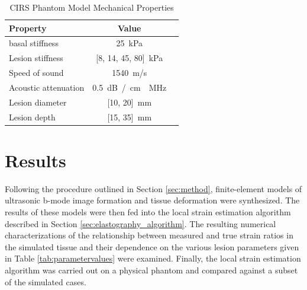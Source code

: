 			\begin{table}[!t]
				\centering
				\caption{CIRS Phantom Model Mechanical Properties}
				\label{tab:phantomproperties}
				\begin{tabular}{lcc}
					\toprule
					Property & Value \\
					\midrule
					\add[MFP]{Nominal} basal stiffness & \SI{25}{kPa} \\
					Lesion stiffness & \SI{[8, 14, 45, 80]}{kPa} \\
					Speed of sound & \SI{1540}{m/s} \\
					Acoustic attenuation & \SI{0.5}{dB / cm \usk MHz} \\
					Lesion diameter & \SI{[10, 20]}{mm} \\
					Lesion depth & \SI{[15, 35]}{mm} \\
					\bottomrule
				\end{tabular}
			\end{table}

	\section{Results}
		Following the procedure outlined in Section \ref{sec:method}, finite-element models of ultrasonic b-mode image formation and tissue deformation were synthesized. The results of these models were then fed into the local strain estimation algorithm described in Section \ref{sec:elastography_algorithm}. The resulting numerical characterizations of the relationship between measured and true strain ratios in the simulated tissue and their dependence on the various lesion parameters given in Table \ref{tab:parametervalues} were examined. Finally, the local strain estimation algorithm was carried out on a physical phantom and compared against a subset of the simulated cases.

